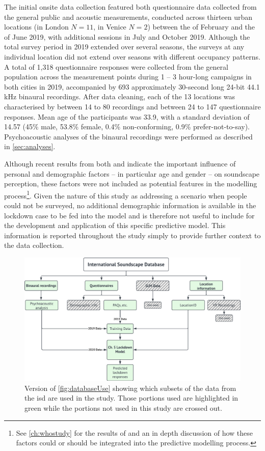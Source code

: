    The initial onsite data collection featured both questionnaire data collected from the general public and acoustic measurements, conducted across thirteen urban locations (in London $N=11$, in Venice $N=2$) between the  of February and the  of June 2019, with additional sessions in July and October 2019. Although the total survey period in 2019 extended over several seasons, the surveys at any individual location did not extend over seasons with different occupancy patterns. A total of 1,318 questionnaire responses were collected from the general population across the measurement points during 1 -- 3 hour-long campaigns in both cities in 2019, accompanied by 693 approximately 30-second long 24-bit 44.1 kHz binaural recordings. After data cleaning, each of the 13 locations was characterised by between 14 to 80 recordings and between 24 to 147 questionnaire responses. Mean age of the participants was 33.9, with a standard deviation of 14.57 (45\% male, 53.8\% female, 0.4\% non-conforming, 0.9\% prefer-not-to-say). Psychoacoustic analyses of the binaural recordings were performed as described in \cref{sec:analyses}.

   Although recent results from both \citet{Tarlao2020Investigating} and \citet{Erfanian2021Psychological} indicate the important influence of personal and demographic factors -- in particular age and gender -- on soundscape perception, these factors were not included as potential features in the modelling process\footnote{See \cref{ch:whostudy} for the results of \citet{Erfanian2021Psychological} and an in depth discussion of how these factors could or should be integrated into the predictive modelling process.}. Given the nature of this study as addressing a scenario when people could not be surveyed, no additional demographic information is available in the lockdown case to be fed into the model and is therefore not useful to include for the development and application of this specific predictive model. This information is reported throughout the study simply to provide further context to the data collection.

\begin{figure}[h]
  \centering
  \includegraphics[width=\textwidth]{Figures/Database use figure - Chap 5.png}
  \caption{Version of \ref{fig:databaseUse} showing which subsets of the data from the \gls{isd} are used in the study. Those portions used are highlighted in green while the portions not used in this study are crossed out. \label{fig:databaseUse5}}
\end{figure}

